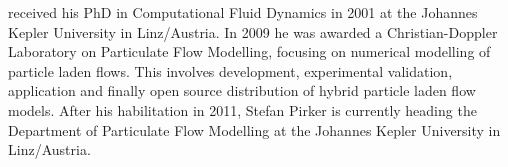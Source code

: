  received his PhD in Computational Fluid Dynamics in 2001 at the Johannes Kepler University in Linz/Austria. 
In 2009 he was awarded a Christian-Doppler Laboratory on Particulate Flow Modelling, focusing on numerical modelling of particle laden flows. 
This involves development, experimental validation, application and finally open source distribution of hybrid particle laden flow models. 
After his habilitation in 2011, Stefan Pirker is currently heading the Department of Particulate Flow Modelling at the Johannes Kepler University in Linz/Austria.
